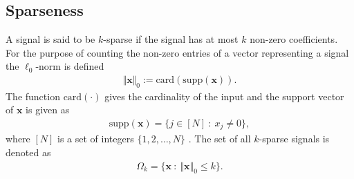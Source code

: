 \subsection{Sparseness} 
A signal is said to be $k$-sparse if the signal has at most $k$ non-zero coefficients. 
For the purpose of counting the non-zero entries of a vector representing a signal the $\ell_0$-norm is defined
\begin{align*}
\Vert \mathbf{x} \Vert_0 := \text{card}(\text{supp}(\mathbf{x})).
\end{align*}
The function $\text{card}(\cdot)$ gives the cardinality of the input and the support vector of $\mathbf{x}$ is given as
\begin{align*}
\text{supp}(\mathbf{x}) = \{ j \in [N] \ : \ x_j \neq 0 \},
\end{align*} 
where $[N]$ is a set of integers $\lbrace 1, 2, \hdots, N \rbrace$ \cite[p. 41]{FR}. 
The set of all $k$-sparse signals is denoted as
\begin{align*}
\Omega_k = \{ \mathbf{x} \ : \ \Vert \mathbf{x} \Vert_0 \leq k \}.
\end{align*}

